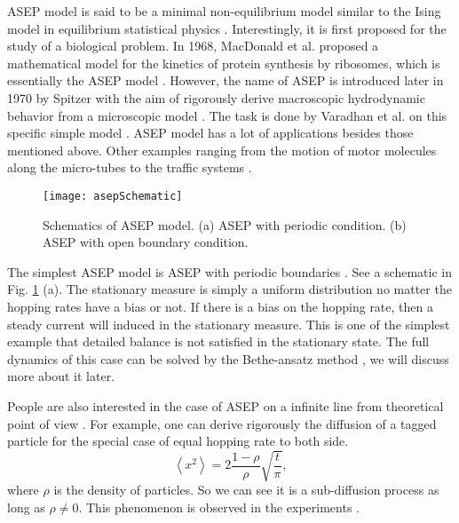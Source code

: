 ASEP model is said to be a minimal non-equilibrium model similar to the Ising model in equilibrium statistical physics \cite{Derrida1998, Mallick2011b}. Interestingly, it is first proposed for the study of a biological problem. In 1968, MacDonald et al. proposed a mathematical model for the kinetics of protein synthesis by ribosomes, which is essentially the ASEP model \cite{Macdonald1968}. However, the name of ASEP is introduced later in 1970 by Spitzer with the aim of rigorously derive macroscopic hydrodynamic behavior from a microscopic model \cite{Spitzer1970}. The task is done by Varadhan et al. on this specific simple model \cite{hsu1999}. ASEP model has a lot of applications besides those mentioned above. Other examples ranging from the motion of motor molecules along the micro-tubes to the traffic systems \cite{Bressloff2013, schadschneider2010}. 

\begin{figure}[htpb]
    \centering
    \texttt{[image: asepSchematic]}
    \caption{Schematics of ASEP model. (a) ASEP with periodic condition. (b) ASEP with open boundary condition.}
    \label{fig:asepSchematic}
\end{figure}

The simplest ASEP model is ASEP with periodic boundaries \cite{Mallick2011b}. See a schematic in Fig. \ref{fig:asepSchematic} (a). The stationary measure is simply a uniform distribution no matter the hopping rates have a bias or not. If there is a bias on the hopping rate, then a steady current will induced in the stationary measure. This is one of the simplest example that detailed balance is not satisfied in the stationary state. The full dynamics of this case can be solved by the Bethe-ansatz method \cite{Batchelor2007}, we will discuss more about it later. 

People are also interested in the case of ASEP on a infinite line from theoretical point of view \cite{Levitt1973,Barkai2010a,Chou2011}. For example, one can derive rigorously the diffusion of a tagged particle for the special case of equal hopping rate to both side.
\begin{equation}
    \label{eq:diffusionInfASEP}
    \left< x^2 \right> = 2 \frac{1-\rho}{\rho}\sqrt{\frac{t}{\pi}},
\end{equation}
where $\rho$ is the density of particles. So we can see it is a sub-diffusion process as long as $\rho\neq 0$. This phenomenon is observed in the experiments \cite{Chou2011}.


